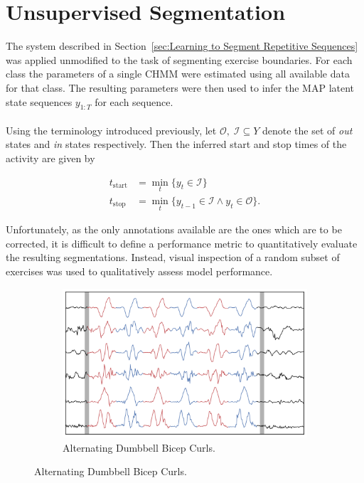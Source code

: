 \documentclass[12pt]{report}
\newcommand{\1}[0]{\mathbbm{1}}
\newcommand{\seq}[3]{\ensuremath{#1_{{#2}:{#3}}}}
\begin{document}
\section{Unsupervised Segmentation}
\label{sec:Unsupervised Segmentation}
The system described in Section~\ref{sec:Learning to Segment Repetitive Sequences} was applied unmodified
to the task of segmenting exercise boundaries. For each class the parameters of a single \ac{CHMM}
were estimated using all available data for that class. The resulting parameters were then
used to infer the \ac{MAP} latent state sequences $\seq{y}{1}{T}$ for each sequence.
\\\\
Using the terminology introduced previously, let $\mathcal{O},\; \mathcal{I} \subseteq Y$
denote the set of \emph{out} states and \emph{in} states respectively.
Then the inferred start and stop times of the activity are given by

\begin{align*}
    t_\text{start} &= \min_t\{ y_t \in \mathcal{I}\} \\
    t_\text{stop} &= \min_t\{y_{t-1} \in \mathcal{I} \land y_t \in \mathcal{O}\}.
\end{align*}

Unfortunately, as the only annotations available are the ones which are to be corrected,
it is difficult to define a performance metric to quantitatively evaluate the resulting segmentations.
Instead, visual inspection of a random subset of exercises was used to qualitatively assess model performance.

\begin{figure}[H]
    \centering
    \begin{subfigure}{0.82\textwidth}
        \includegraphics[width=\textwidth]{img/segmentation/alt_db_bicep_curl.pdf}
        \caption{Alternating Dumbbell Bicep Curls.}
        \label{fig:actseg:alt-db-curl}
    \end{subfigure}
\end{figure}
\end{document}
